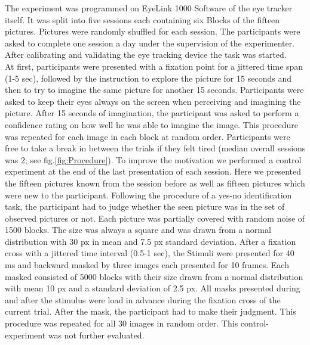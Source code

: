 \documentclass[a4paper,man,natbib,floatsintext]{apa6}
\begin{document}
The experiment was programmed on EyeLink 1000 Software of the eye tracker itself. It was split into five sessions each containing six Blocks of the fifteen pictures. Pictures were randomly shuffled for each session. 
The participants were asked to complete one session a day under the supervision of the experimenter. After calibrating and validating the eye tracking device the task was started.\\
At first, participants were presented with a fixation point for a jittered time span (1-5 sec), followed by the instruction to explore the picture for 15 seconds and then to try to imagine the same picture for another 15 seconds. Participants were asked to keep their eyes always on the screen when perceiving and imagining the picture. After 15 seconds of imagination, the participant was asked to perform a confidence rating on how well he was able to imagine the image. This procedure was repeated for each image in each block at random order. Participants were free to take a break in between the trials if they felt tired (median overall sessions was 2; see fig.\ref{fig:Procedure}). 
To improve the motivation we performed a control experiment at the end of the last presentation of each session. Here we presented the fifteen pictures known from the session before as well as fifteen pictures which were new to the participant. Following the procedure of a yes-no identification task, the participant had to judge whether the seen picture was in the set of observed pictures or not. Each picture was partially covered with random noise of 1500 blocks. The size was always a square and was drawn from a normal distribution with 30 px in mean and 7.5 px standard deviation. After a fixation cross with a jittered time interval (0.5-1 sec), the Stimuli were presented for 40 ms and backward masked by three images each presented for 10 frames. Each masked consisted of 5000 blocks with their size drawn from a normal distribution with mean 10 px and a standard deviation of 2.5 px. All masks presented during and after the stimulus were load in advance during the fixation cross of the current trial. After the mask, the participant had to make their judgment. This procedure was repeated for all 30 images in random order. This control-experiment was not further evaluated.\\
\end{document}
